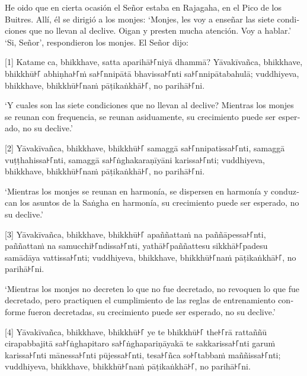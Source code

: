 \begin{english}
  He oido que en cierta ocasión el Señor estaba en Rajagaha, en el Pico de los
  Buitres. Allí, él se dirigió a los monjes: `Monjes, les voy a enseñar las siete
  condiciones que no llevan al declive. Oigan y presten mucha atención. Voy
  a hablar.' `Si, Señor', respondieron los monjes. El Señor dijo:
\end{english}

[1] Katame ca, bhikkhave, satta aparihā꜔꜒niyā dhammā? Yāvakīvañca, bhikkhave, bhikkhū꜔꜒
abhiṇha꜔꜒ṁ sa꜔꜒nnipātā bhavissa꜔꜒nti sa꜔꜒nnipātabahulā; vuddhiyeva, bhikkhave,
bhikkhū꜔꜒naṁ pāṭikaṅkhā꜔꜒, no parihā꜔꜒ni.

\begin{english}
  `Y cuales son las siete condiciones que no llevan al declive? Mientras los monjes
  se reunan con frequencia, se reunan asiduamente, su crecimiento puede ser
  esperado, no su declive.'

\end{english}

[2] Yāvakīvañca, bhikkhave, bhikkhū꜔꜒ samaggā sa꜔꜒nnipatissa꜔꜒nti, samaggā
vuṭṭhahissa꜔꜒nti, samaggā sa꜔꜒ṅghakaraṇīyāni karissa꜔꜒nti; vuddhiyeva, bhikkhave,
bhikkhū꜔꜒naṁ pāṭikaṅkhā꜔꜒, no parihā꜔꜒ni.

\begin{english}
  `Mientras los monjes se reunan en harmonía, se dispersen en
  harmonía y conduzcan los asuntos de la Saṅgha en harmonía, su crecimiento puede ser
  esperado, no su declive.'
\end{english}

[3] Yāvakīvañca, bhikkhave, bhikkhū꜔꜒ apaññattaṁ na paññāpessa꜔꜒nti, paññattaṁ na
samucchi꜔꜒ndissa꜔꜒nti, yathā꜔꜒paññattesu sikkhā꜔꜒padesu samādāya vattissa꜔꜒nti;
vuddhiyeva, bhikkhave, bhikkhū꜔꜒naṁ pāṭikaṅkhā꜔꜒, no parihā꜔꜒ni.

\begin{english}
  `Mientras los monjes no decreten lo que no fue decretado, no revoquen lo que
  fue decretado, pero practiquen el cumplimiento de las reglas de entrenamiento conforme
  fueron decretadas, su crecimiento puede ser
  esperado, no su declive.'
\end{english}

[4] Yāvakīvañca, bhikkhave, bhikkhū꜔꜒ ye te bhikkhū꜔꜒ the꜔꜒rā rattaññū cirapabbajitā
sa꜔꜒ṅghapitaro sa꜔꜒ṅghapariṇāyakā te sakkarissa꜔꜒nti garuṁ karissa꜔꜒nti mānessa꜔꜒nti
pūjessa꜔꜒nti, tesa꜔꜒ñca so꜔꜒tabbaṁ maññissa꜔꜒nti; vuddhiyeva, bhikkhave, bhikkhū꜔꜒naṁ
pāṭikaṅkhā꜔꜒, no parihā꜔꜒ni.

